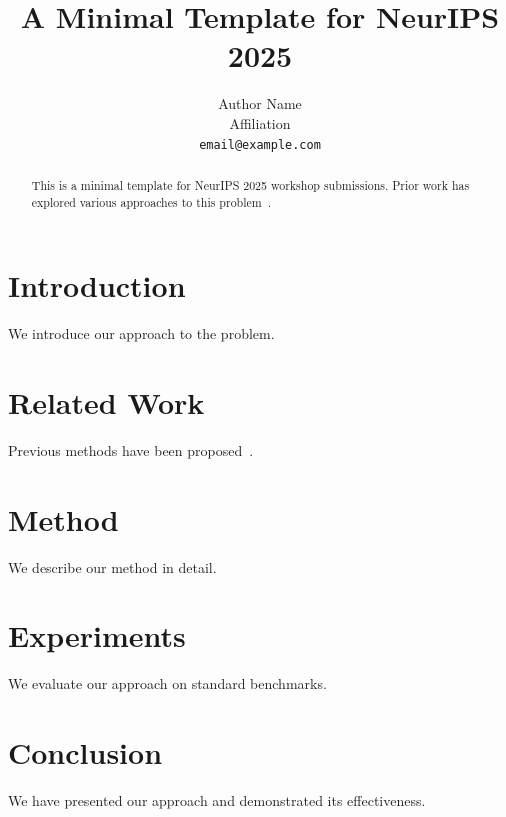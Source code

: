 \documentclass{article}
\title{A Minimal Template for NeurIPS 2025}
\author{
  Author Name \\
  Affiliation \\
  \texttt{email@example.com}
}
\begin{document}
\maketitle

\begin{abstract}
This is a minimal template for NeurIPS 2025 workshop submissions.
Prior work has explored various approaches to this problem~\citep{example2024}.
\end{abstract}

\section{Introduction}
We introduce our approach to the problem.

\section{Related Work}
Previous methods have been proposed~\citep{example2024}.

\section{Method}
We describe our method in detail.

\section{Experiments}
We evaluate our approach on standard benchmarks.

\section{Conclusion}
We have presented our approach and demonstrated its effectiveness.



\end{document}
